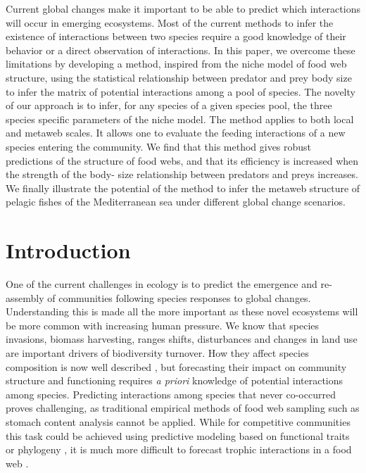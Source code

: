\documentclass[12pt]{article}
\begin{document}
Current global changes make it important to be able to predict which
interactions will occur in emerging ecosystems. Most of the current methods to
infer the existence of interactions between two species require a good knowledge
of their behavior or a direct observation of interactions. In this paper, we
overcome these limitations by developing a method, inspired from the niche model
of food web structure, using the statistical relationship between predator and
prey body size to infer the matrix of potential interactions among a pool of
species. The novelty of our approach is to infer, for any species of a given
species pool, the three species specific parameters of the niche model. The
method applies to both local and metaweb scales. It allows one to evaluate the
feeding interactions of a new species entering the community. We find that this
method gives robust predictions of the structure of food webs, and that its
efficiency is increased when the strength of the body- size relationship between
predators and preys increases. We finally illustrate the potential of the method
to infer the metaweb structure of pelagic fishes of the Mediterranean sea under
different global change scenarios.

\newpage

\section{Introduction}
One of the current challenges in ecology is to predict the emergence and
re-assembly of communities following species responses to global changes.
Understanding this is made all the more important as these novel ecosystems will
be more common with increasing human pressure. We know that species invasions,
biomass harvesting, ranges shifts, disturbances and changes in land use are
important drivers of biodiversity turnover. How they affect species composition
is now well described \parencite{Pereira2010}, but forecasting their impact on
community structure and functioning requires \emph{a priori} knowledge of
potential interactions among species. Predicting interactions among species that
never co-occurred proves challenging, as traditional empirical methods of food
web sampling such as stomach content analysis cannot be applied. While for
competitive communities this task could be achieved using predictive modeling
based on functional traits \parencite{McGill2006, Albouy2010} or phylogeny
\parencite{Cavender-Bares2009, Mouquet2012} , it is much more difficult to
forecast trophic interactions in a food web \parencite{Ings2009,
Tylianakis2008,Montoya2010}.
\end{document}
